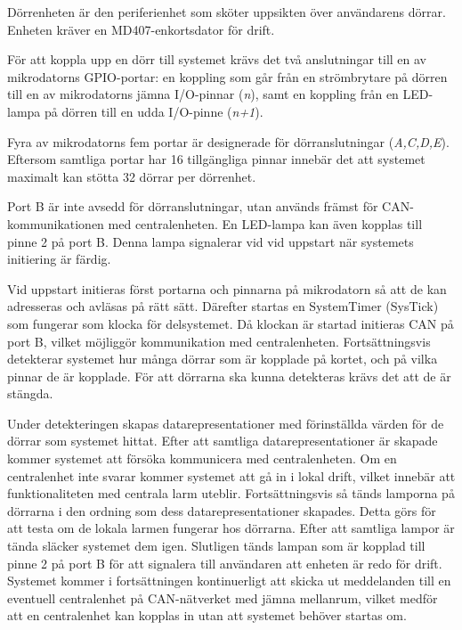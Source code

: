 \documentclass{article}
\begin{document}
Dörrenheten är den periferienhet som sköter uppsikten över användarens dörrar. Enheten kräver en MD407-enkortsdator för drift.

För att koppla upp en dörr till systemet krävs det två anslutningar till en av mikrodatorns GPIO-portar: en koppling som går från en strömbrytare på dörren till en av mikrodatorns jämna I/O-pinnar (\textit{n}), samt en koppling från en LED-lampa på dörren till en udda I/O-pinne (\textit{n+1}).

Fyra av mikrodatorns fem portar är designerade för dörranslutningar (\textit{A,C,D,E}). \\
Eftersom samtliga portar har 16 tillgängliga pinnar innebär det att systemet maximalt kan stötta 32 dörrar per dörrenhet.

Port B är inte avsedd för dörranslutningar, utan används främst för CAN-\\kommunikationen
med centralenheten. En LED-lampa kan även kopplas till \\ pinne 2 på port B. Denna lampa signalerar vid vid uppstart när systemets initiering är färdig.

Vid uppstart initieras först portarna och pinnarna på mikrodatorn så att de kan adresseras
och avläsas på rätt sätt. Därefter startas en SystemTimer (SysTick) som fungerar som klocka för delsystemet.
Då klockan är startad initieras CAN på port B, vilket möjliggör kommunikation med centralenheten. Fortsättningsvis detekterar systemet hur många dörrar som är kopplade på kortet, och på vilka pinnar de är kopplade. För att dörrarna ska kunna detekteras krävs det att de är stängda.

Under detekteringen skapas datarepresentationer med förinställda värden för de dörrar som systemet
hittat. Efter att samtliga datarepresentationer är skapade kommer systemet att försöka kommunicera med centralenheten. Om en centralenhet inte svarar kommer systemet att gå in i lokal drift, vilket innebär att funktionaliteten med centrala larm uteblir.
Fortsättningsvis så tänds lamporna på dörrarna i den ordning som dess datarepresentationer skapades. Detta görs för att testa om de lokala larmen fungerar hos dörrarna. Efter att samtliga lampor är tända släcker systemet dem igen.
Slutligen tänds lampan som är kopplad till pinne 2 på port B för att signalera till användaren att enheten är redo för drift. Systemet kommer i fortsättningen kontinuerligt att skicka ut meddelanden till en eventuell centralenhet på CAN-nätverket med jämna mellanrum, vilket medför att en centralenhet kan kopplas in utan att systemet behöver startas om.
\end{document}
